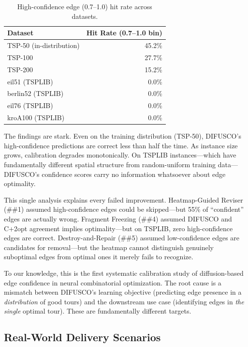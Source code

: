 \documentclass[11pt,a4paper]{article}
\begin{document}
\begin{table}[H]
\centering
\footnotesize
\caption{High-confidence edge (0.7--1.0) hit rate across datasets.}
\label{tab:calib}
\begin{tabular}{@{}lr@{}}
\toprule
Dataset & Hit Rate (0.7--1.0 bin) \\
\midrule
TSP-50 (in-distribution) & 45.2\% \\
TSP-100 & 27.7\% \\
TSP-200 & 15.2\% \\
eil51 (TSPLIB) & 0.0\% \\
berlin52 (TSPLIB) & 0.0\% \\
eil76 (TSPLIB) & 0.0\% \\
kroA100 (TSPLIB) & 0.0\% \\
\bottomrule
\end{tabular}
\end{table}

The findings are stark. Even on the training distribution (TSP-50), DIFUSCO's high-confidence predictions are correct less than half the time. As instance size grows, calibration degrades monotonically. On TSPLIB instances---which have fundamentally different spatial structure from random-uniform training data---DIFUSCO's confidence scores carry no information whatsoever about edge optimality.

This single analysis explains every failed improvement. Heatmap-Guided Reviser (\#\#1) assumed high-confidence edges could be skipped---but 55\% of ``confident'' edges are actually wrong. Fragment Freezing (\#\#4) assumed DIFUSCO and C+2opt agreement implies optimality---but on TSPLIB, zero high-confidence edges are correct. Destroy-and-Repair (\#\#5) assumed low-confidence edges are candidates for removal---but the heatmap cannot distinguish genuinely suboptimal edges from optimal ones it merely fails to recognize.

To our knowledge, this is the first systematic calibration study of diffusion-based edge confidence in neural combinatorial optimization. The root cause is a mismatch between DIFUSCO's learning objective (predicting edge presence in a \textit{distribution} of good tours) and the downstream use case (identifying edges in \textit{the single} optimal tour). These are fundamentally different targets.

\subsection{Real-World Delivery Scenarios}
\end{document}
